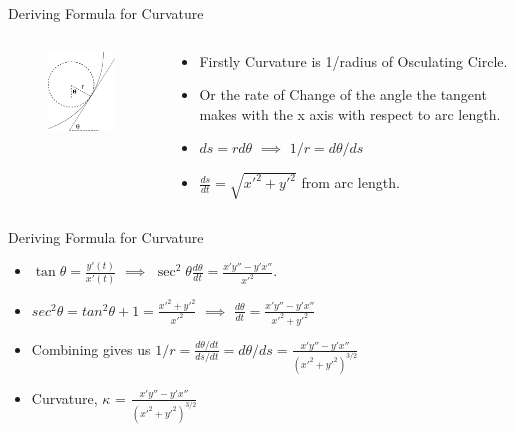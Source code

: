 \documentclass{beamer}
\begin{document}
\begin{frame}{Deriving Formula for Curvature}
	\begin{columns}
		\begin{column}{0.4\textwidth}
			\begin{figure}
				\centering
				\includegraphics[width=50mm, scale=0.4]{illustration.png}
			\end{figure}
		\end{column}
		\begin{column}{0.6\textwidth}
			\begin{itemize}
				\item Firstly Curvature is 1/radius of Osculating Circle.
				\item Or the rate of Change of the angle the tangent makes with the x axis with respect to arc length.
				\item $ds=rd\theta$ $\implies$ $1/r=d\theta/ds$
				
				\item $\frac{ds}{dt} = \sqrt{x'^2+y'^2}$ from arc length.
				
				
			
			\end{itemize}
			
			
			
		\end{column}
	\end{columns}

	
\end{frame}

\begin{frame}{Deriving Formula for Curvature}
	\begin{itemize}
			\item $\tan \theta = \frac{y'(t)}{x'(t)}$ $\implies$ $\sec ^2 \theta \frac{d\theta}{dt} = \frac{x' y'' - y' x''}{x'^2}$.
			\item $sec^2\theta = tan^2\theta +1 = \frac{x'^2+y'^2}{x'^2}$ $\implies$
		$\frac{d\theta}{dt}=\frac{x' y'' - y' x''}{x'^2+y'^2}$
		
		
		
		\item Combining gives us
		$1/r= \frac{d\theta/dt}{ds/dt} = d\theta/ds = \frac{x' y'' - y' x''}{(x'^2+y'^2)^{3/2}}$
		
		\item Curvature, $\kappa$ = $\frac{x' y'' - y' x''}{(x'^2+y'^2)^{3/2}}$
	\end{itemize}
\end{frame}
\end{document}
